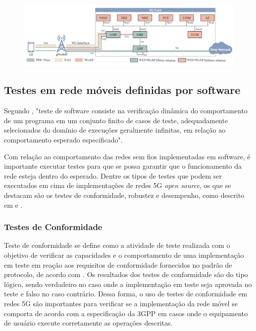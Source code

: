 \begin{figure}
    \centering
    \includegraphics[width=1\textwidth]{TG1/Images/5GSystemProtocols.png}
    \label{fig:5Gprotocols}
\end{figure}

\subsection{Testes em rede móveis definidas por software}

Segundo \cite{Bertolino2003}, "teste de software consiste na verificação dinâmica do comportamento de um programa em um conjunto finito de casos de teste, adequadamente selecionados do domínio de execuções geralmente infinitas, em relação ao comportamento esperado especificado".

Com relação ao comportamento das redes sem fios implementadas em software, é importante executar testes para que se possa garantir que o funcionamento da rede esteja dentro do esperado.
Dentre os tipos de testes que podem ser executados em cima de implementações de redes 5G \textit{open source}, os que se destacam são os testes de conformidade, robustez e desempenho, como descrito em \cite{Dominato2021} e \cite{Zhang2019ASO}.

\subsubsection{Testes de Conformidade}

Teste de conformidade se define como a atividade de teste realizada com o objetivo de verificar as capacidades e o comportamento de uma implementação em teste em reação aos requisitos de conformidade fornecidos no padrão de protocolo, de acordo com \cite{Sarikaya1989}.
Os resultados dos testes de conformidade são do tipo lógico, sendo verdadeiro no caso onde a implementação em teste seja aprovada no teste e falso no caso contrário.
Dessa forma, o uso de testes de conformidade em redes 5G são importantes para verificar se a implementação da rede móvel se comporta de acordo com a especificação da 3GPP em casos onde o equipamento de usuário execute corretamente as operações descritas.

